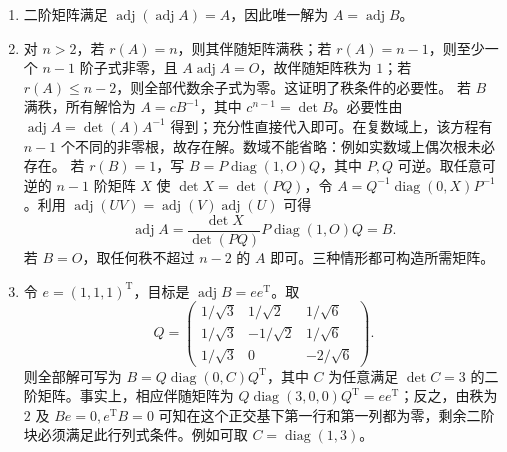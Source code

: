\documentclass[12pt,fontset=fandol]{ctexart}
\begin{document}
\begin{solve}
\begin{enumerate}
\item 二阶矩阵满足 $\operatorname{adj}(\operatorname{adj}A)=A$，因此唯一解为 $A=\operatorname{adj}B$。
\item 对 $n>2$，若 $r(A)=n$，则其伴随矩阵满秩；若 $r(A)=n-1$，则至少一个 $n-1$ 阶子式非零，且 $A\operatorname{adj}A=O$，故伴随矩阵秩为 $1$；若 $r(A)\le n-2$，则全部代数余子式为零。这证明了秩条件的必要性。
若 $B$ 满秩，所有解恰为 $A=cB^{-1}$，其中 $c^{n-1}=\det B$。必要性由 $\operatorname{adj}A=\det(A)A^{-1}$ 得到；充分性直接代入即可。在复数域上，该方程有 $n-1$ 个不同的非零根，故存在解。数域不能省略：例如实数域上偶次根未必存在。
若 $r(B)=1$，写 $B=P\operatorname{diag}(1,O)Q$，其中 $P,Q$ 可逆。取任意可逆的 $n-1$ 阶矩阵 $X$ 使 $\det X=\det(PQ)$，令 $A=Q^{-1}\operatorname{diag}(0,X)P^{-1}$。利用 $\operatorname{adj}(UV)=\operatorname{adj}(V)\operatorname{adj}(U)$ 可得
\[\operatorname{adj}A=\frac{\det X}{\det(PQ)}P\operatorname{diag}(1,O)Q=B.\]
若 $B=O$，取任何秩不超过 $n-2$ 的 $A$ 即可。三种情形都可构造所需矩阵。
\item 令 $e=(1,1,1)^{\mathrm T}$，目标是 $\operatorname{adj}B=ee^{\mathrm T}$。取
\[Q=\begin{pmatrix}1/\sqrt3&1/\sqrt2&1/\sqrt6\\1/\sqrt3&-1/\sqrt2&1/\sqrt6\\1/\sqrt3&0&-2/\sqrt6\end{pmatrix}.\]
则全部解可写为 $B=Q\operatorname{diag}(0,C)Q^{\mathrm T}$，其中 $C$ 为任意满足 $\det C=3$ 的二阶矩阵。事实上，相应伴随矩阵为 $Q\operatorname{diag}(3,0,0)Q^{\mathrm T}=ee^{\mathrm T}$；反之，由秩为 $2$ 及 $Be=0,e^{\mathrm T}B=0$ 可知在这个正交基下第一行和第一列都为零，剩余二阶块必须满足此行列式条件。例如可取 $C=\operatorname{diag}(1,3)$。\end{enumerate}
\end{solve}
\end{document}

